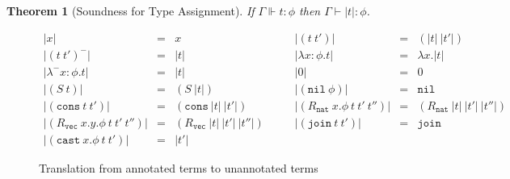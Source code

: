 \documentclass[copyright]{eptcs}
\newtheorem{theorem}{Theorem}
\newcommand{\vc}[0]{\texttt{vec}}
\newcommand{\nat}[0]{\texttt{nat}}
\newcommand{\nil}[0]{\texttt{nil}}
\newcommand{\cons}[0]{\texttt{cons}}
\newcommand{\join}[0]{\texttt{join}}
\newcommand{\cast}[0]{\texttt{cast}}
\newcommand{\drop}[1]{| #1 |}
\begin{document}
\begin{theorem}[Soundness for Type Assignment]
If $\Gamma \Vdash t:\phi$ then $\Gamma \vdash \drop{t} : \phi$.
\end{theorem}

\begin{comment}
We omit the corresponding notion of completeness,
since the unrestricted nature of the type assignment rule for
\texttt{(join)} (of Figure~\ref{fig:typing}) makes it impossible to
have a complete corresponding rule in the annotated system.
\end{comment}

\begin{figure}
\[
\begin{array}{lllllll}
\drop{x} & = & x &\ \ \ \ \ & 
\drop{(t\ t')} & = & (\drop{t}\ \drop{t'}) \\
\drop{(t\ t')^-} & = & \drop{t} &\ \ \ &
\drop{\lambda x:\phi.t} & = & \lambda x.\drop{t} \\
\drop{\lambda^- x:\phi.t} & = & \drop{t} &\ \ \ &
\drop{0} & = & 0 \\
\drop{(S\ t)} & = & (S\ \drop{t}) &\ \ \ &
\drop{(\nil\ \phi)} & = & \nil \\
\drop{(\cons\ t\ t')} & = & (\cons\ \drop{t}\ \drop{t'}) &\ \ \ &
\drop{(R_\nat\ x.\phi\ t\ t'\ t'')} & = & (R_\nat\ \drop{t}\ \drop{t'}\ \drop{t''})\\
\drop{(R_\vc\ x.y.\phi\ t\ t'\ t'')} & = & (R_\vc\ \drop{t}\ \drop{t'}\ \drop{t''}) &\ \ \ &
\drop{(\join\ t\ t')} & = & \join \\
\drop{(\cast\ x.\phi\ t\ t')} & = & \drop{t'} &\ &\ &\ &\  
\end{array}
\]
\caption{Translation from annotated terms to unannotated terms}
\label{fig:drop}
\end{figure}
\end{document}
